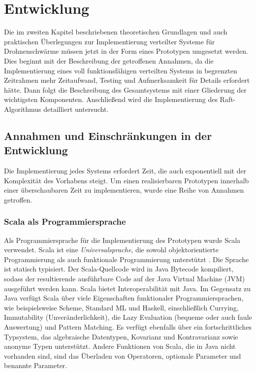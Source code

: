 \chapter{Entwicklung}
\label{cha:Entwicklung}

Die im zweiten Kapitel beschriebenen theoretischen Grundlagen und auch praktischen Überlegungen zur Implementierung verteilter Systeme für Drohnenschwärme müssen jetzt in der Form eines Prototypen umgesetzt werden. Dies beginnt mit der Beschreibung der getroffenen Annahmen, da die Implementierung eines voll funktionsfähigen verteilten Systems in begrenzten Zeitrahmen mehr Zeitaufwand, Testing und Aufmerksamkeit für Details erfordert hätte. Dann folgt die Beschreibung des Gesamtsystems mit einer Gliederung der wichtigsten Komponenten. Anschließend wird die Implementierung des Raft-Algorithmus detailliert untersucht.

\section{Annahmen und Einschränkungen in der Entwicklung}

Die Implementierung jedes Systems erfordert Zeit, die auch exponentiell mit der Komplexität des Vorhabens steigt. Um einen realisierbaren Prototypen innerhalb einer überschaubaren Zeit zu implementieren, wurde eine Reihe von Annahmen getroffen.

\subsection{Scala als Programmiersprache}

Als Programmiersprache für die Implementierung des Prototypen wurde Scala verwendet. Scala ist eine \textit{Universalsprache}, die sowohl objektorientierte Programmierung als auch funktionale Programmierung unterstützt \cite{Odersky04anoverview}. Die Sprache ist statisch typisiert. Der Scala-Quellcode wird in Java Bytecode kompiliert, sodass der resultierende ausführbare Code auf der Java Virtual Machine (JVM) ausgeführt werden kann. Scala bietet Interoperabilität mit Java. Im Gegensatz zu Java verfügt Scala über viele Eigenschaften funktionaler Programmiersprachen, wie beispielsweise Scheme, Standard ML und Haskell, einschließlich Currying, Immutability (Unveränderlichkeit), die Lazy Evaluation (bequeme oder auch faule Auswertung) und Pattern Matching. Es verfügt ebenfalls über ein fortschrittliches Typsystem, das algebraische Datentypen, Kovarianz und Kontravarianz sowie anonyme Typen unterstützt. Andere Funktionen von Scala, die in Java nicht vorhanden sind, sind das Überladen von Operatoren, optionale Parameter und benannte Parameter.

